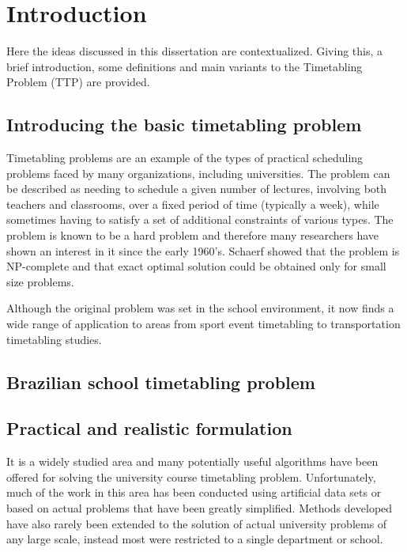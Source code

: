 \chapter{Introduction}
\label{chap:intro}


Here the ideas discussed in this dissertation are contextualized. Giving this, a brief introduction, some definitions and main variants to the Timetabling Problem (TTP) are provided.

\section{Introducing the basic timetabling problem}

Timetabling problems are an example of the types of practical scheduling problems faced by many organizations, including universities. The problem can be described as needing to schedule a given number of lectures, involving both teachers and classrooms, over a fixed period of time (typically a week), while sometimes having to satisfy a set of additional constraints of various types. The problem is known to be a hard problem and therefore many researchers have shown an interest in it since the early 1960's. Schaerf \cite{Schaerf99} showed that the problem is NP-complete and that exact optimal solution could be obtained only for small size problems.

Although the original problem was set in the school environment, it now finds a wide range of application to areas from sport event timetabling to transportation timetabling studies.


\section{Brazilian school timetabling problem}



\section{Practical and realistic formulation}

It is a widely studied area and many potentially useful algorithms have been offered for solving the university course timetabling problem. Unfortunately, much of the work in this area has been conducted using artificial data sets or based on actual problems that have been greatly simplified. Methods developed have also rarely been extended to the solution of actual university problems of any large scale, instead most were restricted to a single department or school.

